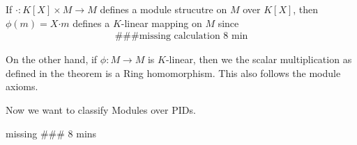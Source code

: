 If $\bm{\cdot}: K[X] \times M \to M$ defines a module strucutre on $M$ over $K[X]$, then  $\phi(m) = X \bm{\cdot} m$ defines a $K$-linear mapping on $M$ since
\begin{align*}
	\#\#\# \text{missing calculation 8 min}
\end{align*}

On the other hand, if $\phi: M \to M$ is $K$-linear, then we the scalar multiplication as defined in the theorem is a Ring homomorphism. This also follows the module axioms.



Now we want to classify Modules over PIDs.



missing \#\#\# 8 mins




